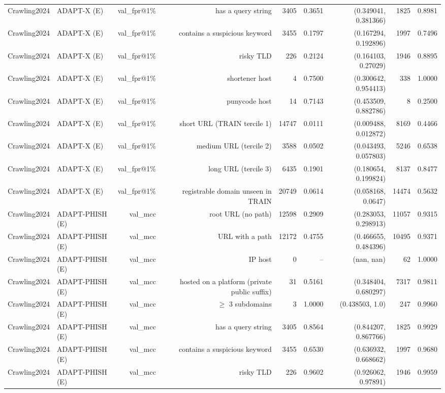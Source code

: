 \begin{table}[t]
\begin{tabular}{llrrrrrrr}
Crawling2024 & ADAPT-X (E) & val\_fpr@1\% & has a query string & 3405 & 0.3651 & (0.349041, 0.381366) & 1825 & 0.8981 \\
Crawling2024 & ADAPT-X (E) & val\_fpr@1\% & contains a suspicious keyword & 3455 & 0.1797 & (0.167294, 0.192896) & 1997 & 0.7496 \\
Crawling2024 & ADAPT-X (E) & val\_fpr@1\% & risky TLD & 226 & 0.2124 & (0.164103, 0.27029) & 1946 & 0.8895 \\
Crawling2024 & ADAPT-X (E) & val\_fpr@1\% & shortener host & 4 & 0.7500 & (0.300642, 0.954413) & 338 & 1.0000 \\
Crawling2024 & ADAPT-X (E) & val\_fpr@1\% & punycode host & 14 & 0.7143 & (0.453509, 0.882786) & 8 & 0.2500 \\
Crawling2024 & ADAPT-X (E) & val\_fpr@1\% & short URL (TRAIN tercile 1) & 14747 & 0.0111 & (0.009488, 0.012872) & 8169 & 0.4466 \\
Crawling2024 & ADAPT-X (E) & val\_fpr@1\% & medium URL (tercile 2) & 3588 & 0.0502 & (0.043493, 0.057803) & 5246 & 0.6538 \\
Crawling2024 & ADAPT-X (E) & val\_fpr@1\% & long URL (tercile 3) & 6435 & 0.1901 & (0.180654, 0.199824) & 8137 & 0.8477 \\
Crawling2024 & ADAPT-X (E) & val\_fpr@1\% & registrable domain unseen in TRAIN & 20749 & 0.0614 & (0.058168, 0.0647) & 14474 & 0.5632 \\
Crawling2024 & ADAPT-PHISH (E) & val\_mcc & root URL (no path) & 12598 & 0.2909 & (0.283053, 0.298913) & 11057 & 0.9315 \\
Crawling2024 & ADAPT-PHISH (E) & val\_mcc & URL with a path & 12172 & 0.4755 & (0.466655, 0.484396) & 10495 & 0.9371 \\
Crawling2024 & ADAPT-PHISH (E) & val\_mcc & IP host & 0 & -- & (nan, nan) & 62 & 1.0000 \\
Crawling2024 & ADAPT-PHISH (E) & val\_mcc & hosted on a platform (private public suffix) & 31 & 0.5161 & (0.348404, 0.680297) & 7317 & 0.9811 \\
Crawling2024 & ADAPT-PHISH (E) & val\_mcc & $\geq$ 3 subdomains & 3 & 1.0000 & (0.438503, 1.0) & 247 & 0.9960 \\
Crawling2024 & ADAPT-PHISH (E) & val\_mcc & has a query string & 3405 & 0.8564 & (0.844207, 0.867766) & 1825 & 0.9929 \\
Crawling2024 & ADAPT-PHISH (E) & val\_mcc & contains a suspicious keyword & 3455 & 0.6530 & (0.636932, 0.668662) & 1997 & 0.9680 \\
Crawling2024 & ADAPT-PHISH (E) & val\_mcc & risky TLD & 226 & 0.9602 & (0.926062, 0.97891) & 1946 & 0.9959 \\

\end{tabular}
\end{table}
